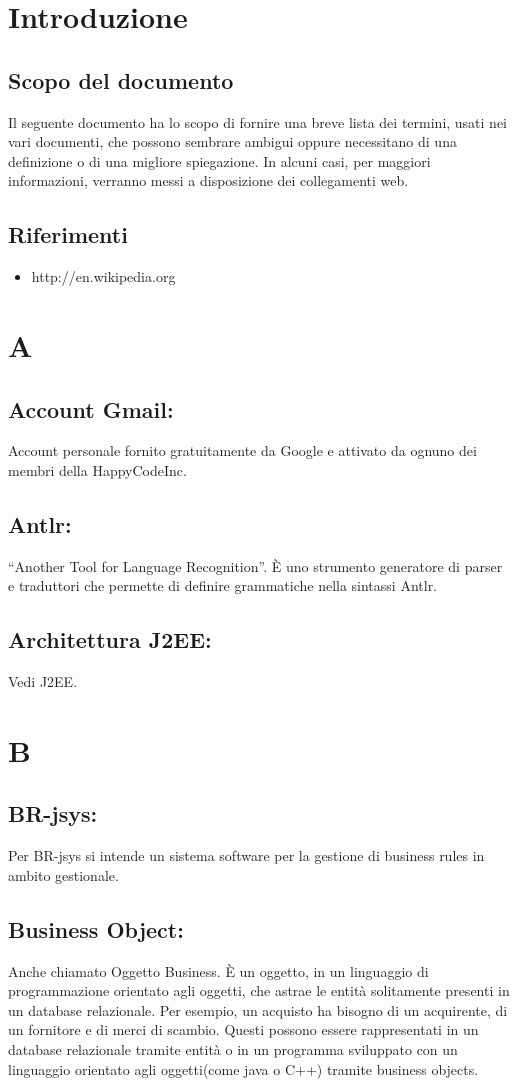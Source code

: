\documentclass[11pt,titlepage,a4paper]{report}
\begin{document}
\chapter{Introduzione}
\section{Scopo del documento}
Il seguente documento ha lo scopo di fornire una breve lista dei termini, usati nei vari documenti, che possono sembrare ambigui oppure necessitano di una definizione o di una migliore spiegazione. In alcuni casi, per maggiori informazioni, verranno messi a disposizione dei collegamenti web.
\section{Riferimenti}
\begin{itemize}
\item http://en.wikipedia.org
\end{itemize}
\chapter{A}
\section{Account Gmail:}
Account personale fornito gratuitamente da Google e attivato da ognuno dei membri della HappyCodeInc.
\section{Antlr:}
``Another Tool for Language Recognition''. \`E uno strumento generatore di parser e traduttori che permette di definire grammatiche nella sintassi Antlr.
\section{Architettura J2EE:}
Vedi J2EE.

\chapter{B}
\section{BR-jsys:}
Per BR-jsys si intende un sistema software per la gestione di business rules in ambito gestionale.
\section{Business Object:}
Anche chiamato Oggetto Business. \`E un oggetto, in un linguaggio di programmazione orientato agli oggetti, che astrae le entit\`a solitamente presenti in un database relazionale.
Per esempio, un acquisto ha bisogno di un acquirente, di un fornitore e di merci di scambio. Questi possono essere rappresentati in un database relazionale tramite entit\`a o in un programma sviluppato con un linguaggio orientato agli oggetti(come java o C++) tramite business objects.
\end{document}
